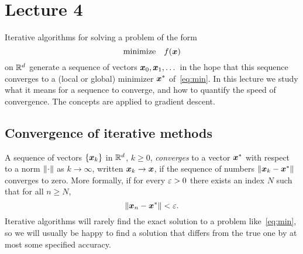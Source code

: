%
%
% 


\chapter*{Lecture 4}
\addtocounter{chapter}{1}
\addtocounter{section}{-1}


Iterative algorithms for solving a problem of the form
\begin{equation}\label{eq:min}
 \text{minimize}\quad f(\bm{x})
\end{equation}
on $\mathbb{R}^d$ generate a sequence of vectors $\bm{x}_0,\bm{x}_1,\dots$ in the hope that this sequence converges to a (local or global) minimizer $\bm{x}^*$ of~\eqref{eq:min}. In this lecture we study what it means for a sequence to converge, and how to quantify the speed of convergence. The concepts are applied to gradient descent.

\section{Convergence of iterative methods}
A sequence of vectors $\{\bm{x}_k\}$ in $\mathbb{R}^d$, $k\geq 0$, {\em converges} to a vector $\bm{x}^*$ with respect to a norm $\Vert {\cdot}\Vert$ as $k\to \infty$, written $\bm{x}_k\to \bm{x}$, if the sequence of numbers $\Vert {\bm{x}_k-\bm{x}^*}\Vert$ converges to zero. More formally, if for every $\varepsilon>0$ there exists an index $N$ such that for all $n\geq N$,
\begin{equation*}
 \Vert {\bm{x}_n-\bm{x}^*}\Vert< \varepsilon.
\end{equation*}
Iterative algorithms will rarely find the exact solution to a problem like~\eqref{eq:min}, so we will usually be happy to find a solution that differs from the true one by at most some specified accuracy.

